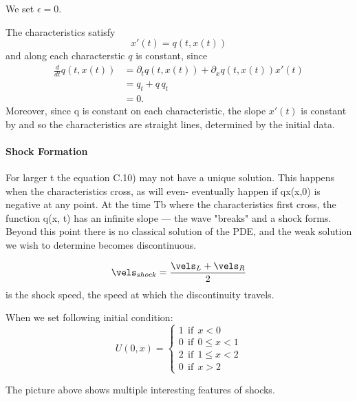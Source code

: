 We set $\epsilon = 0$.

The characteristics satisfy
\begin{equation}
    x'(t) = q(t,x(t))
\end{equation}
and along each characterstic $q$ is constant, since
\begin{align}
    \frac{d}{dt}q(t,x(t))   &= \partial_t q(t,x(t)) + \partial_x q(t,x(t)) x'(t) \\
                            &= q_t + q\,q_t \\
                            &= 0.
\end{align}
Moreover, since q is constant on each characteristic, the slope $x'(t)$ is constant
by  and so the characteristics are straight lines, determined by the initial
data.

\paragraph{Shock Formation}
For larger t the equation C.10) may not have a
unique solution. This happens when the characteristics cross, as will even-
eventually happen if qx(x,0) is negative at any point. At the time Tb where the
characteristics first cross, the function q(x, t) has an infinite slope — the wave
"breaks" and a shock forms. Beyond this point there is no classical solution of
the PDE, and the weak solution we wish to determine becomes discontinuous.

\begin{equation}
   \vels_{shock} = \frac{\vels_L + \vels_R}{2}
\end{equation}
is the shock speed, the speed at which the discontinuity travels.

When we set following initial condition:
\begin{equation}
    U(0,x) = 
    \begin{cases}
        1 \ \ \text{if} \ \ x < 0 \\
        0 \ \ \text{if} \ \ 0 \leq x < 1 \\
        2 \ \ \text{if} \ \ 1 \leq x < 2 \\
        0 \ \ \text{if} \ \ x > 2    
    \end{cases}
\end{equation}


The picture above shows multiple interesting features of shocks.

